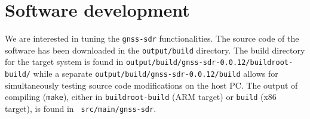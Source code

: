 \documentclass[a4paper]{article}
\begin{document}
\section{Software development}

We are interested in tuning the {\tt gnss-sdr} functionalities. The source code of
the software has been downloaded in the {\tt output/build} directory. The build directory 
for the target system is found in {\tt output/build/gnss-sdr-0.0.12/buildroot-build/} while
a separate {\tt output/build/gnss-sdr-0.0.12/build} allows for simultaneously testing source
code modifications on the host PC. The output of compiling ({\tt make}), either in 
{\tt buildroot-build} (ARM target) or {\tt build} (x86 target), is found in {\tt 
src/main/gnss-sdr}.
\end{document}
